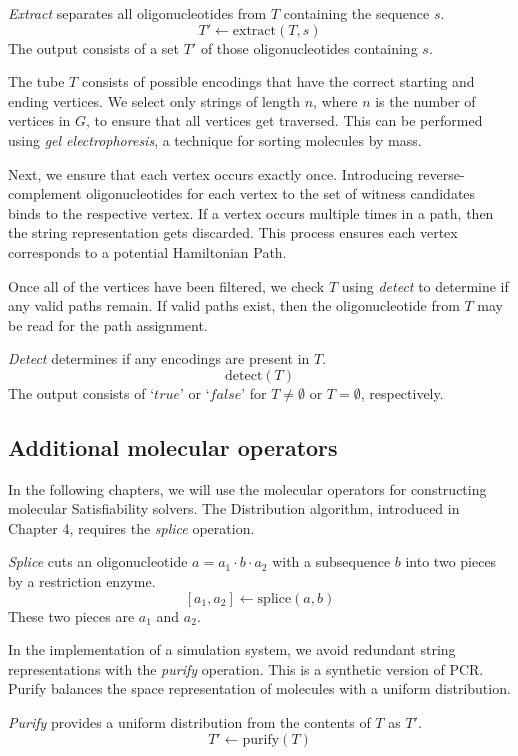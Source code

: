 \begin{definition}
\emph{Extract} separates all oligonucleotides from $T$ containing the sequence $s$.
\[
T' \leftarrow \mathrm{extract}( T, s)
\]
The output consists of a set $T'$ of those oligonucleotides containing $s$.
\end{definition}

The tube $T$ consists of possible encodings that have the correct starting and ending vertices. We select only strings of length $n$, where $n$ is the number of vertices in $G$, to ensure that all vertices get traversed.  This can be performed using \textit{gel electrophoresis}, a technique for sorting molecules by mass.

Next, we ensure that each vertex occurs exactly once.  Introducing reverse-complement oligonucleotides for each vertex to the set of witness candidates binds to the respective vertex.  If a vertex occurs multiple times in a path, then the string representation gets discarded.  This process ensures each vertex corresponds to a potential Hamiltonian Path.

Once all of the vertices have been filtered, we check $T$ using \textit{detect} to determine if any valid paths remain.  If valid paths exist, then the oligonucleotide from $T$ may be read for the path assignment.

\begin{definition}
\emph{Detect} determines if any encodings are present in $T$.  
\[
\mathrm{detect}( T)
\]
The output consists of `$true$' or `$false$' for $T \neq \emptyset$ or $T = \emptyset$, respectively.
\end{definition}

\subsection{Additional molecular operators}

In the following chapters, we will use the molecular operators for constructing molecular {\sc Satisfiability} solvers.  The Distribution algorithm, introduced in Chapter 4, requires the \textit{splice} operation.
\begin{definition}
\emph{Splice} cuts an oligonucleotide $a = a_1 \cdot b \cdot a_2$ with a subsequence $b$ into two pieces by a restriction enzyme.
\[
[a_1, a_2] \leftarrow \mathrm{splice}(a, b)
\]
These two pieces are $a_1$ and $a_2$.
\end{definition}

In the implementation of a simulation system, we avoid redundant string representations with the \textit{purify} operation.  This is a synthetic version of PCR.  Purify balances the space representation of molecules with a uniform distribution.
\begin{definition}
\emph{Purify} provides a uniform distribution from the contents of $T$ as $T'$.
\[
T' \leftarrow \mathrm{purify}(T)
\]
\end{definition}

